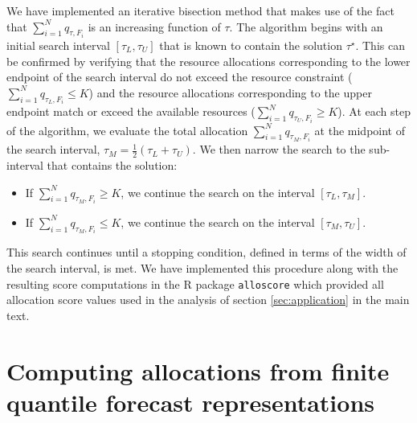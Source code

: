 \documentclass{article}
\begin{document}
We have implemented an iterative bisection method that makes use of the fact that $\sum_{i=1}^N q_{\tau,F_i}$
is an increasing function of $\tau$.
The algorithm begins with an initial search interval $[\tau_L, \tau_U]$ that is known to contain the solution $\tau^{\star}$.
This can be confirmed by verifying that the resource allocations corresponding to the lower endpoint of the search interval do not exceed the resource constraint ($\sum_{i=1}^N q_{\tau_L,F_i} \leq K$) and the resource allocations corresponding to the upper endpoint match or exceed the available resources ($\sum_{i=1}^N q_{\tau_U,F_i} \geq K$).
At each step of the algorithm, we evaluate the total allocation $\sum_{i=1}^N q_{\tau_{M},F_i}$ at the midpoint of the search interval, $\tau_M = \frac{1}{2}(\tau_L + \tau_U)$. We then narrow the search to the sub-interval that contains the solution:
\begin{itemize}
  \item If $\sum_{i=1}^N q_{\tau_{M},F_i} \geq K$, we continue the search on the interval $[\tau_L, \tau_M]$.
  \item If $\sum_{i=1}^N q_{\tau_M, F_i} \leq K$, we continue the search on the interval $[\tau_M, \tau_U]$.
\end{itemize}
This search continues until a stopping condition, defined in terms of the width of the search interval, is met.
We have implemented this procedure along with the resulting score computations in the 
R package \verb`alloscore` which provided all allocation score values used in the analysis of section \ref{sec:application} 
in the main text. 


\section{Computing allocations from finite quantile forecast representations}
\end{document}
